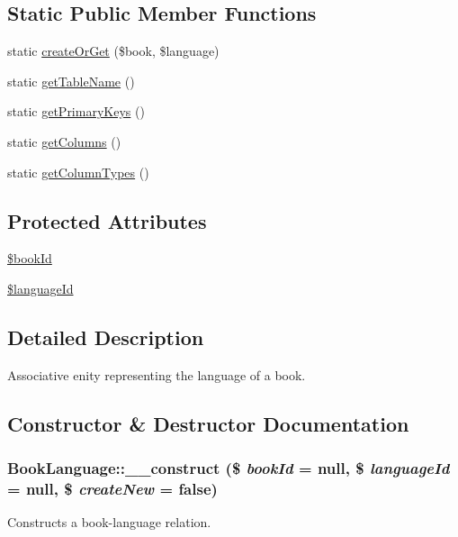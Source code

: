\subsection*{Static Public Member Functions}
\begin{DoxyCompactItemize}
\item 
static \hyperlink{classBookLanguage_a25bff2a665361ac798ebed5ff991e701}{createOrGet} (\$book, \$language)
\item 
static \hyperlink{classBookLanguage_a755bc7ed42e5d959d88a387485279ebd}{getTableName} ()
\item 
static \hyperlink{classBookLanguage_a2efcb1546e54019661200ad14276c5b6}{getPrimaryKeys} ()
\item 
static \hyperlink{classBookLanguage_afc7dd0ea15ff9f1e04006c4ccc0c8bb6}{getColumns} ()
\item 
static \hyperlink{classBookLanguage_a3ec4af1722ff86f65464a563f7c21d12}{getColumnTypes} ()
\end{DoxyCompactItemize}
\subsection*{Protected Attributes}
\begin{DoxyCompactItemize}
\item 
\hyperlink{classBookLanguage_a644c3c8cdc52b582ea932b3ca327840f}{\$bookId}
\item 
\hyperlink{classBookLanguage_a7cb17b4d967db7f5c09f3b9c31f8a8b5}{\$languageId}
\end{DoxyCompactItemize}


\subsection{Detailed Description}
Associative enity representing the language of a book. 

\subsection{Constructor \& Destructor Documentation}
\hypertarget{classBookLanguage_a244f8af6147e237845222422611bf08f}{
\subsubsection[{\_\-\_\-construct}]{\setlength{\rightskip}{0pt plus 5cm}BookLanguage::\_\-\_\-construct (\$ {\em bookId} = {\ttfamily null}, \/  \$ {\em languageId} = {\ttfamily null}, \/  \$ {\em createNew} = {\ttfamily false})}}
\label{classBookLanguage_a244f8af6147e237845222422611bf08f}
Constructs a book-\/language relation.


